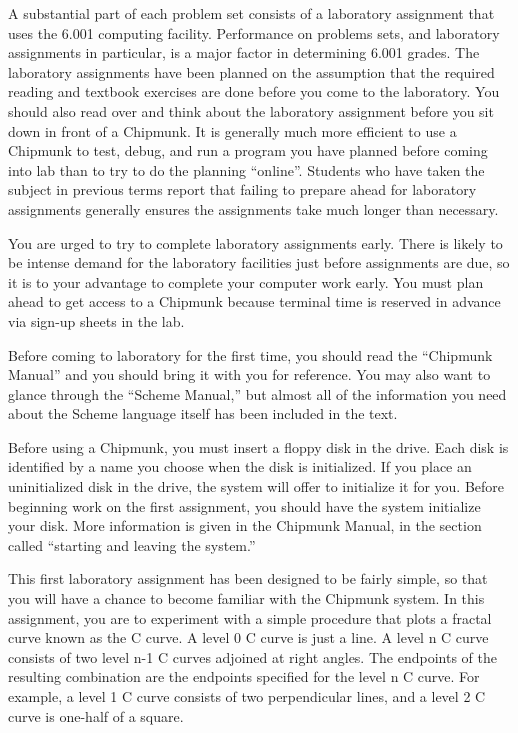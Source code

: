 A substantial part of each problem set consists of a laboratory
assignment that uses the 6.001 computing facility.  
Performance on problems sets, and laboratory assignments in
particular, is a major factor in determining 6.001 grades.
The laboratory assignments have been planned 
on the assumption that the required reading and textbook exercises 
are done before you come to the laboratory.  
You should also read over and think about the laboratory assignment 
before you sit down in front of a Chipmunk.  
It is generally much more efficient to use a Chipmunk to test, debug,
and run a program you have planned before coming into lab than to
try to do the planning ``online''. 
Students who have taken the subject in previous 
terms report that failing to prepare ahead for laboratory assignments
generally ensures the assignments take much longer than necessary.  

You are urged to try to complete laboratory assignments early. 
There is likely to be intense demand
for the laboratory facilities just before assignments are due, 
so it is to your advantage to complete your computer work early.  
You must plan ahead to get access to a Chipmunk because
terminal time is reserved in advance via sign-up sheets in the lab.  

Before coming to laboratory for the first time, you should read the 
``Chipmunk Manual'' and you should bring it with you for reference.  
You may also want to glance through the ``Scheme Manual,'' 
but almost all of the information you need about the Scheme language 
itself has been included in the text.

Before using a Chipmunk, you must insert a floppy disk in the drive.  
Each disk is identified by a name you choose when the disk is 
initialized.  If
you place an uninitialized disk in the drive, the system will offer to
initialize it for you.  Before beginning work on the first assignment,
you should have the system initialize your disk.  More information is
given in the Chipmunk Manual, in the section called ``starting and
leaving the system.''

This first laboratory assignment has been designed to be fairly simple,
so that you will have a chance to become familiar with the Chipmunk
system.
In this assignment, you are to experiment with a simple procedure that
plots a fractal curve known as the C curve.  A level 0 C curve is just
a line.  A level n C curve consists of two level n-1 C curves adjoined
at right angles.  The endpoints of the resulting combination are the
endpoints specified for the level n C curve.  For example, a level 1 C
curve consists of two perpendicular lines, and a level 2 C curve is
one-half of a square.

